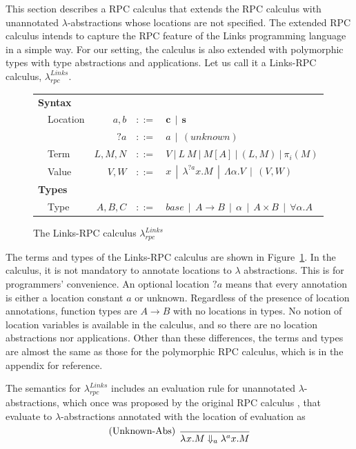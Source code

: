 \documentclass[a4paper]{article}
\theoremstyle{plain}
\theoremstyle{definition}
\newcommand{\ruleverticalsep}{0.5cm}
\newcommand{\linksrpc}{$\lambda_{rpc}^{Links}$\xspace}
\newcommand{\client}{\textbf{c}}
\newcommand{\server}{\textbf{s}}
\newcommand{\evalRPC}[3]{#1\Downarrow_{#2}#3}
\newcommand{\lamL}[3]{\lambda^{#1}#2.#3}
\begin{document}
This section describes a RPC calculus that extends the RPC calculus
\cite{Cooper:2009:RC:1599410.1599439} with unannotated
$\lambda$-abstractions whose locations are not specified.
%
The extended RPC calculus intends to capture the RPC feature of the
Links programming language \cite{Cooper:2006:LWP:1777707.1777724} in a
simple way.
%
For our setting, the calculus is also extended with polymorphic types
with type abstractions and applications.
%
Let us call it a Links-RPC calculus, \linksrpc.


\begin{figure}[h]
\centering  
\begin{tabular}{ l  l  r  c  l }
\multicolumn{5}{l}{\textbf{Syntax}} \\
 & Location & $a,b$   & $::=$ & $\client \ \ | \  \  \server$ \\
 &          & $?a$    & $::=$  & $a  \ \ |  \ \ (unknown) $ \\
 & Term     & $L,M,N$ & $::=$  & $V  \ | \  L \ M  \ | \  M[A]  \ | \  (L,M)  \ |  \ \pi_i(M)$ \\
 & Value & $V,W$ & $::=$ & $x  \ \ |  \ \ \lambda^{?a} x.M  \ \ |  \ \ \Lambda\alpha.V  \ \ |  \ \ (V,W)$
\\[\ruleverticalsep]
\multicolumn{5}{l}{\textbf{Types}} \\
& Type & $A,B,C$ & $::=$
& $base  \ \ | \ \  A \rightarrow B  \ \ | \ \  \alpha  \ \ | \ \  A \times B  \ \ | \ \  \forall\alpha.A$
\end{tabular}
\caption{The Links-RPC calculus \linksrpc}
\label{fig:linksrpc}
\end{figure}

The terms and types of the Links-RPC calculus are shown in
Figure~\ref{fig:linksrpc}.
%
In the calculus, it is not mandatory to annotate locations to
$\lambda$ abstractions. This is for programmers' convenience.
%
An optional location $?a$ means that every annotation is either a location constant $a$ or
unknown.
%
Regardless of the presence of location annotations, function types are
$A \rightarrow B$ with no locations in types.
%
No notion of location variables is available in the calculus, and so
there are no location abstractions nor applications.
%
Other than these differences, the terms and types are almost the same
as those for the polymorphic RPC calculus, which
is in the appendix for reference.
%


The semantics for \linksrpc includes an evaluation rule for
unannotated $\lambda$-abstractions, which once was proposed by the
original RPC calculus \cite{Cooper:2009:RC:1599410.1599439}, that
evaluate to $\lambda$-abstractions annotated with the location of
evaluation as
\[
\begin{prooftree}
  \infer[left label=(Unknown-Abs)]0{ \evalRPC{\lamL{}{x}{M}}{a}{\lamL{a}{x}{M} }}
\end{prooftree}
\]
%
\end{document}

